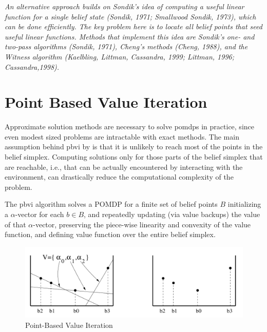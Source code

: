 \emph{An alternative approach builds on Sondik's idea of computing a useful linear function for a
single belief state (Sondik, 1971; Smallwood  Sondik, 1973), which can be done efficiently.
The key problem here is to locate all belief points that seed useful linear functions. 
Methods that implement this idea are Sondik's one- and two-pass algorithms (Sondik, 1971), 
Cheng's methods (Cheng, 1988), and the Witness algorithm 
(Kaelbling, Littman,  Cassandra, 1999; Littman, 1996; Cassandra,1998). 
}

\section{Point Based Value Iteration}
Approximate solution methods are necessary to solve \glspl{pomdp} in practice, since even modest 
sized problems are intractable with exact methods.
The main assumption behind \gls{pbvi} by \cite{10.5555/1630659.1630806} is that
it is unlikely to reach most of the points in the belief simplex.
Computing solutions only for those parts of the belief simplex that are reachable, i.e.,
that can be actually encountered by interacting with the environment, can drastically reduce 
the computational complexity of the problem.

The \gls{pbvi} algorithm solves a POMDP for a finite set of belief points $B$
initializing a $\alpha$-vector for each $b \in B$, and repeatedly updating 
(via value backups) the value of that $\alpha$-vector, preserving the piece-wise linearity 
and convexity of the value function, and defining value
function over the entire belief simplex.
\begin{figure}[H]
    \centering
    \includegraphics[scale=.35]{images/pbvi.png}
    \caption{Point-Based Value Iteration}
    \label{fig:pbvi}
\end{figure}



